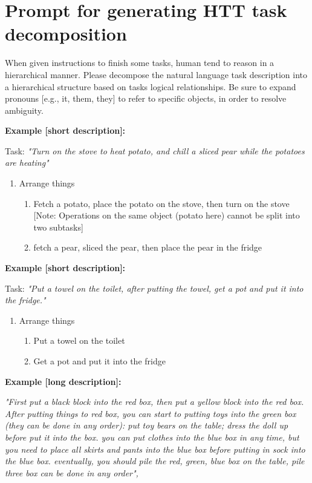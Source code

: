 \documentclass{article}
\begin{document}
\section*{Prompt for generating HTT task decomposition}
When given instructions to finish some tasks, human tend to reason in a hierarchical manner. Please decompose the natural language task description into a hierarchical structure based on tasks logical relationships.  Be sure to expand pronouns [e.g., it, them, they] to refer to specific objects, in order to resolve ambiguity. 

\textbf{Example [short description]:}

Task: \textit{"Turn on the stove to heat potato, and chill a sliced pear while the potatoes are heating"}
\begin{enumerate}
    \item  Arrange things
    \begin{enumerate}
        \item Fetch a potato, place the potato on the stove, then turn on the stove [Note: Operations on the same object (potato here) cannot be split into two subtasks]
        \item fetch a pear, sliced the pear, then place the pear in the fridge
    \end{enumerate}
\end{enumerate}

\textbf{Example [short description]:}

Task:\textit{ "Put a towel on the toilet, after putting the towel, get a pot and put it into the fridge."}
\begin{enumerate}
    \item  Arrange things
    \begin{enumerate}
        \item Put a towel on the toilet
        \item Get a pot and put it into the fridge
    \end{enumerate}
\end{enumerate}
    
\textbf{Example [long description]:}

\textit{"First put a black block into the red box, then put a yellow block into the red box. After putting things to red box, you can start to putting toys into the green box (they can be done in any order): put toy bears on the table; dress the doll up before put it into the box. you can put clothes into the blue box in any time, but you need to place all skirts and pants into the blue box before putting in sock into the blue box. eventually, you should pile the red, green, blue box on the table, pile three box can be done in any order",}
\end{document}
